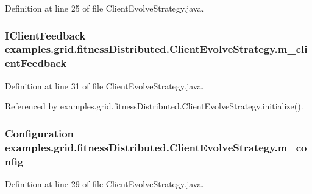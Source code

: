 Definition at line 25 of file Client\-Evolve\-Strategy.\-java.

\hypertarget{classexamples_1_1grid_1_1fitness_distributed_1_1_client_evolve_strategy_a61f755a872db4d7a4e41fdfbc6cd75df}{
\subsubsection[{m\-\_\-client\-Feedback}]{\setlength{\rightskip}{0pt plus 5cm}I\-Client\-Feedback examples.\-grid.\-fitness\-Distributed.\-Client\-Evolve\-Strategy.\-m\-\_\-client\-Feedback\hspace{0.3cm}{\ttfamily [private]}}}\label{classexamples_1_1grid_1_1fitness_distributed_1_1_client_evolve_strategy_a61f755a872db4d7a4e41fdfbc6cd75df}


Definition at line 31 of file Client\-Evolve\-Strategy.\-java.



Referenced by examples.\-grid.\-fitness\-Distributed.\-Client\-Evolve\-Strategy.\-initialize().

\hypertarget{classexamples_1_1grid_1_1fitness_distributed_1_1_client_evolve_strategy_aacec10581f524f5dce17f416de96affa}{
\subsubsection[{m\-\_\-config}]{\setlength{\rightskip}{0pt plus 5cm}Configuration examples.\-grid.\-fitness\-Distributed.\-Client\-Evolve\-Strategy.\-m\-\_\-config\hspace{0.3cm}{\ttfamily [private]}}}\label{classexamples_1_1grid_1_1fitness_distributed_1_1_client_evolve_strategy_aacec10581f524f5dce17f416de96affa}


Definition at line 29 of file Client\-Evolve\-Strategy.\-java.



